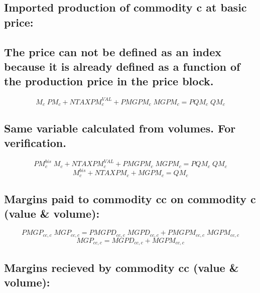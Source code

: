 \documentclass[12pt]{article}
\numberwithin{equation}{section}
\begin{document}
\subsection{ Imported production of commodity c at basic price:}




\subsection{ The price can not be defined as an index because it is already defined as a function of the production price in the price block.}



\begin{dmath}
M_{c} \; PM_{c} + NTAXPM^{VAL}_{c} + PMGPM_{c} \; MGPM_{c} = PQM_{c} \; QM_{c}
\end{dmath}



\subsection{Same variable calculated from volumes. For verification.}



\begin{dmath}
PM^{bis}_{c} \; M_{c} + NTAXPM^{VAL}_{c} + PMGPM_{c} \; MGPM_{c} = PQM_{c} \; QM_{c}
\end{dmath}
\begin{dmath}
M^{bis}_{c} + NTAXPM_{c} + MGPM_{c} = QM_{c}
\end{dmath}



\subsection{Margins paid to commodity cc on commodity c (value \& volume):}


\begin{dmath}
PMGP_{cc, c} \; MGP_{cc, c} = PMGPD_{cc, c} \; MGPD_{cc, c} + PMGPM_{cc, c} \; MGPM_{cc, c}
\end{dmath}
\begin{dmath}
MGP_{cc, c} = MGPD_{cc, c} + MGPM_{cc, c}
\end{dmath}



\subsection{Margins recieved by commodity cc (value \& volume):}
\end{document}
